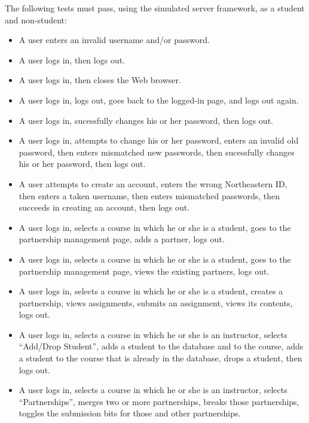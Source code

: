 \documentclass[a4paper]{article}
\begin{document}

The following tests must pass, using the simulated server framework, as a
student and non-student:

\begin{itemize}
  \item{A user enters an invalid username and/or password.}
  \item{A user logs in, then logs out.}
  \item{A user logs in, then closes the Web browser.}
  \item{A user logs in, logs out, goes back to the logged-in page, and logs out
    again.}
  \item{A user logs in, sucessfully changes his or her password, then logs out.}
  \item{A user logs in, attempts to change his or her password, enters an
    invalid old password, then enters mismatched new passwords, then
    sucessfully changes his or her password, then logs out.}
  \item{A user attempts to create an account, enters the wrong Northeastern ID,
    then enters a taken username, then enters mismatched passwords, then
    succeeds in creating an account, then logs out.}
  \item{A user logs in, selects a course in which he or she is a student, goes
    to the partnership management page, adds a partner, logs out.}
  \item{A user logs in, selects a course in which he or she is a student, goes
    to the partnership management page, views the existing partners, logs out.}
  \item{A user logs in, selects a course in which he or she is a student,
    creates a partnership, views assignments, submits an assignment, views its
    contents, logs out.}
  \item{A user logs in, selects a course in which he or she is an instructor,
    selects ``Add/Drop Student'', adds a student to the database and to the
    course, adds a student to the course that is already in the database, drops
    a student, then logs out.}
  \item{A user logs in, selects a course in which he or she is an instructor,
    selects ``Partnerships'', merges two or more partnerships, breaks those
    partnerships, toggles the submission bits for those and other partnerships.}
\end{itemize}
\end{document}
